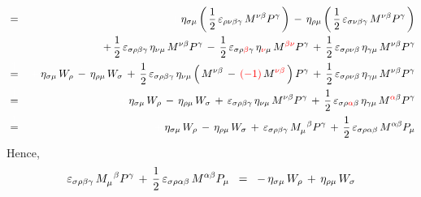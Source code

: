 \begin{enumerate}
\begin{eqnarray*}
    & = &
	    {\color{white}\,+\,}
	    \eta_{\sigma\mu}\left(\,
    	    \dfrac{1}{2}\,\varepsilon_{\rho\nu\beta\gamma}\,M^{\nu\beta}P^{\gamma}
	    	\,\right)
	    \,\overset{{\color{white}.}}{-}\,
	    \eta_{\rho\mu}\left(\,
		    \dfrac{1}{2}\,\varepsilon_{\sigma\nu\beta\gamma}\,M^{\nu\beta}P^{\gamma}
	    	\,\right)
    \\
    &&
	    \,+\,
	    \dfrac{1}{2}\,\varepsilon_{\sigma\rho\beta\gamma}\,\eta_{\nu\mu}\,M^{\nu\beta}P^{\gamma}
	    \,-\,
	    \dfrac{1}{2}\,\varepsilon_{\sigma\rho{\color{red}\beta}\gamma}\,\eta_{{\color{red}\nu}\mu}\,
	    	M^{{\color{red}\beta\nu}}P^{\gamma}
	    \,+\,
	    \dfrac{1}{2}\,\varepsilon_{\sigma\rho\nu\beta}\,\eta_{\gamma\mu}\,M^{\nu\beta}P^{\gamma}
	\\
    & \overset{{\color{white}\textnormal{\large$1$}}}{=} &
	    {\color{white}\,+\,}
	    \eta_{\sigma\mu}\,W_{\rho}
	    \,\overset{{\color{white}.}}{-}\,
	    \eta_{\rho\mu}\,W_{\sigma}
	    \,+\,
	    \dfrac{1}{2}\,\varepsilon_{\sigma\rho\beta\gamma}\,\eta_{\nu\mu}
	    	\left(\,
	    		M^{\nu\beta}
	    		\,\overset{{\color{white}.}}{-}\,
	    		{\color{red}(-1)}\,M^{{\color{red}\nu\beta}}
	    		\,\right)
			P^{\gamma}
	    \,+\,
	    \dfrac{1}{2}\,\varepsilon_{\sigma\rho\nu\beta}\,\eta_{\gamma\mu}\,M^{\nu\beta}P^{\gamma}
	\\
    & \overset{{\color{white}\textnormal{\large$1$}}}{=} &
	    {\color{white}\,+\,}
	    \eta_{\sigma\mu}\,W_{\rho}
	    \,\overset{{\color{white}.}}{-}\,
	    \eta_{\rho\mu}\,W_{\sigma}
	    \,+\,
	    \varepsilon_{\sigma\rho\beta\gamma}\,\eta_{\nu\mu}\,M^{\nu\beta}P^{\gamma}
	    \,+\,
	    \dfrac{1}{2}\,\varepsilon_{\sigma\rho{\color{red}\alpha}\beta}\,
	    	\eta_{\gamma\mu}\,M^{{\color{red}\alpha}\beta}P^{\gamma}
	\\
    & \overset{{\color{white}\textnormal{\large$1$}}}{=} &
	    {\color{white}\,+\,}
	    \eta_{\sigma\mu}\,W_{\rho}
	    \,\overset{{\color{white}.}}{-}\,
	    \eta_{\rho\mu}\,W_{\sigma}
	    \,+\,
	    \varepsilon_{\sigma\rho\beta\gamma}\,M^{{\color{white}\mu}\beta}_{\mu}P^{\gamma}
	    \,+\,
	    \dfrac{1}{2}\,\varepsilon_{\sigma\rho\alpha\beta}\,M^{\alpha\beta}P_{\mu}
    \end{eqnarray*}
    Hence,
    \begin{equation*}
    \varepsilon_{\sigma\rho\beta\gamma}\,M^{{\color{white}\mu}\beta}_{\mu}P^{\gamma}
    \,+\,
    \dfrac{1}{2}\,\varepsilon_{\sigma\rho\alpha\beta}\,M^{\alpha\beta}P_{\mu}
    \;\; = \;\;
	    -\,\eta_{\sigma\mu}\,W_{\rho}
	    \,\overset{{\color{white}.}}{+}\,
	    \eta_{\rho\mu}\,W_{\sigma}

\end{equation*}
\end{enumerate}
